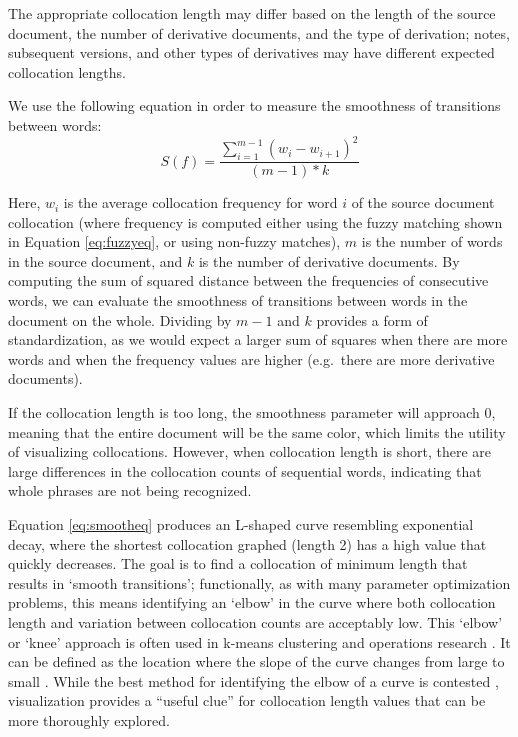 The appropriate collocation length may differ based on the length of the source document, the number of derivative documents, and the type of derivation; notes, subsequent versions, and other types of derivatives may have different expected collocation lengths.

We use the following equation in order to measure the smoothness of transitions between words:
\begin{equation}
S(f)=\frac{\sum_{i=1}^{m-1}(w_i-w_{i+1})^2}{(m-1)*k}
\label{eq:smootheq}
  \end{equation}

Here, \(w_i\) is the average collocation frequency for word \(i\) of the source document collocation (where frequency is computed either using the fuzzy matching shown in Equation \eqref{eq:fuzzyeq}, or using non-fuzzy matches), \(m\) is the number of words in the source document, and \(k\) is the number of derivative documents.
By computing the sum of squared distance between the frequencies of consecutive words, we can evaluate the smoothness of transitions between words in the document on the whole.
Dividing by \(m-1\) and \(k\) provides a form of standardization, as we would expect a larger sum of squares when there are more words and when the frequency values are higher (e.g.~there are more derivative documents).

If the collocation length is too long, the smoothness parameter will approach 0, meaning that the entire document will be the same color, which limits the utility of visualizing collocations.
However, when collocation length is short, there are large differences in the collocation counts of sequential words, indicating that whole phrases are not being recognized.

Equation \eqref{eq:smootheq} produces an L-shaped curve resembling exponential decay, where the shortest collocation graphed (length 2) has a high value that quickly decreases.
The goal is to find a collocation of minimum length that results in `smooth transitions'; functionally, as with many parameter optimization problems, this means identifying an `elbow' in the curve where both collocation length and variation between collocation counts are acceptably low.
This `elbow' or `knee' approach is often used in k-means clustering \citep{schubert_stop_2023} and operations research \citep{thomas_knee_1999}.
It can be defined as the location where the slope of the curve changes from large to small \citep{thomas_knee_1999}.
While the best method for identifying the elbow of a curve is contested \citep{schubert_stop_2023}, visualization provides a ``useful clue'' \citep{thomas_knee_1999} for collocation length values that can be more thoroughly explored.

